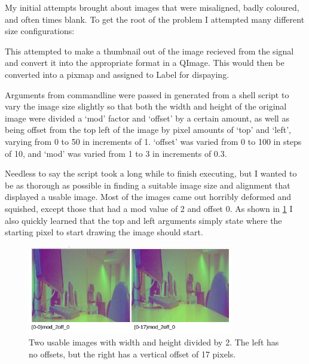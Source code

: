 My initial attempts brought about images that were misaligned, badly coloured, and often times blank. To get the root of the problem I attempted many different size configurations:
\begin{frame}[fragile]
	\vspace{-20pt}
	
	\label{code:shell1}
\end{frame}
This attempted to make a thumbnail out of the image recieved from the signal and convert it into the appropriate format in a QImage. This would then be converted into a pixmap and assigned to Label for dispaying.

Arguments from commandline were passed in generated from a shell script to vary the image size slightly so that both the width and height of the original image were divided a ‘mod’ factor and ‘offset’ by a certain amount, as well as being offset from the top left of the image by pixel amounts of ‘top’ and ‘left’, varying from 0 to 50 in increments of 1. ‘offset’ was varied from 0 to 100 in steps of 10, and ‘mod’ was varied from 1 to 3 in increments of 0.3.

Needless to say the script took a long while to finish executing, but I wanted to be as thorough as possible in finding a suitable image size and alignment that displayed a usable image. Most of the images came out horribly deformed and squished, except those that had a mod value of 2 and offset 0. As shown in \cref{fig:shell1} I also quickly learned that the top and left arguments simply state where the starting pixel to start drawing the image should start.
\begin{figure}
	\begin{center}
		\includegraphics[width=0.8\textwidth]{../images/qpix/shell1}
	\end{center}
	\vspace{-20pt}
	\caption{Two usable images with width and height divided by 2. The left has no offsets, but the right has a vertical offset of 17 pixels. }
	\label{fig:shell1}
\end{figure}

